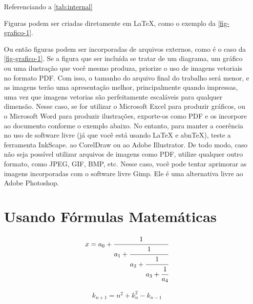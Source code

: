 \lipsum[2] Referenciando a \autoref{tab:internal} \lipsum[2]

Figuras podem ser criadas diretamente em LaTeX,
como o exemplo da \ref{fig-grafico-1}.

\begin{figure}[h!]
	\centering
\end{figure}

Ou então figuras podem ser incorporadas de arquivos externos, como é o caso da \autoref{fig-grafico-1}. Se a figura que ser incluída se tratar de um diagrama, um gráfico ou uma ilustração que você mesmo produza, priorize o uso de imagens vetoriais no formato PDF. Com isso, o tamanho do arquivo final do trabalho será menor, e as imagens terão uma apresentação melhor, principalmente quando impressas, uma vez que imagens vetorias são perfeitamente escaláveis para qualquer dimensão. Nesse caso, se for utilizar o Microsoft Excel para produzir gráficos, ou o Microsoft Word para produzir ilustrações, exporte-os como PDF e os incorpore ao documento conforme o exemplo abaixo. No entanto, para manter a coerência no uso de software livre (já que você está usando LaTeX e abnTeX),  teste a ferramenta InkScape. ao CorelDraw ou ao Adobe Illustrator.  De todo modo, caso não seja possível  utilizar arquivos de imagens como PDF, utilize qualquer outro formato, como JPEG, GIF, BMP, etc.  Nesse caso, você pode tentar aprimorar as imagens incorporadas com o software livre Gimp. Ele é uma alternativa livre ao Adobe Photoshop.

\section{Usando Fórmulas Matemáticas}

\lipsum[2]

	\begin{equation}
		\begin{aligned}
			x = a_0 + \cfrac{1}{a_1
				+ \cfrac{1}{a_2
					+ \cfrac{1}{a_3 + \cfrac{1}{a_4} } } }
		\end{aligned}
	\end{equation}

\lipsum[3]

	\begin{equation}
		\begin{aligned}
			k_{n+1} = n^2 + k_n^2 - k_{n-1}
		\end{aligned}
	\end{equation}

